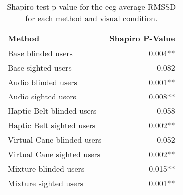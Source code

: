
\begin{table}[!htb]
\centering
\caption{Shapiro test p-value for the ecg average RMSSD for each method and visual condition.}
\label{tab:shapiro_ecg_rmssd}
\begin{tabular}{lr}
\toprule
                    Method & Shapiro P-Value \\
\midrule
        Base blinded users &         0.004** \\
        Base sighted users &           0.082 \\
       Audio blinded users &         0.001** \\
       Audio sighted users &         0.008** \\
 Haptic Belt blinded users &           0.058 \\
 Haptic Belt sighted users &         0.002** \\
Virtual Cane blinded users &           0.052 \\
Virtual Cane sighted users &         0.002** \\
     Mixture blinded users &         0.015** \\
     Mixture sighted users &         0.001** \\
\bottomrule
\end{tabular}
\end{table}


